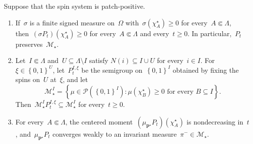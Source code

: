 \documentclass[EJP,preprint,NODS,nobera]{ejpecp}
\newcommand{\bb}[1]{\left(#1\right)}
\newcommand{\cb}[1]{\left\{#1\right\}}
\newcommand{\mb}[1]{\mathbf{#1}}
\begin{document}
\begin{lemma}
\label{lem:centered-cone-preservation}
\label{lem:boundary-moment-preservation}
\label{lem:threshold-product-limit}
Suppose that the spin system is patch-positive.
\begin{enumerate}[label=\textup{(\alph*)}]
\item If~$\sigma$ is a finite signed measure on~$\Omega$
with~$\sigma(\chi_A^\star)\geq0$ for every~$A\Subset\Lambda$,
then~$(\sigma P_t)(\chi_A^\star)\geq0$ for every~$A\Subset\Lambda$ and
every~$t\geq0$. In particular,~$P_t$ preserves~$\mathcal M_\star$.
\item Let~$I\Subset\Lambda$ and~$U\subseteq\Lambda\setminus I$ satisfy
$N(i)\subseteq I\cup U$ for every~$i\in I$. For~$\xi\in\cb{0,1}^U$,
let~$P_t^{I,\xi}$ be the semigroup on~$\cb{0,1}^I$ obtained by fixing the
spins on~$U$ at~$\xi$, and let
\begin{equation*}
\mathcal M_\star^I
=
\cb{
\mu\in\mathcal P\bb{\cb{0,1}^I}:
\mu(\chi_B^\star)\geq0
\text{ for every }B\subseteq I
}.
\end{equation*}
Then~$\mathcal M_\star^I P_t^{I,\xi}\subseteq\mathcal M_\star^I$ for
every~$t\geq0$.
\item For every~$A\Subset\Lambda$, the centered
moment~$(\mu_{\mb p^\star}P_t)(\chi_A^\star)$ is nondecreasing in~$t$,
and~$\mu_{\mb p^\star}P_t$ converges weakly to an invariant
measure~$\pi^-\in\mathcal M_\star$.
\end{enumerate}
\end{lemma}
\end{document}
